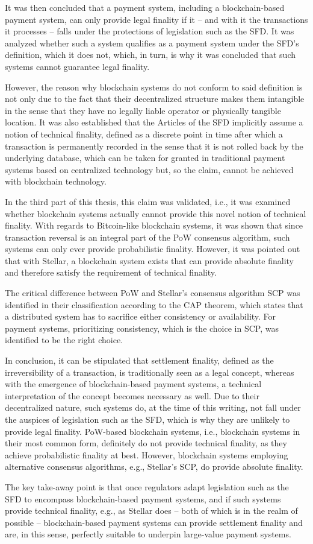 It was then concluded that a payment system, including a blockchain-based payment system, can only provide legal finality if it -- and with it the transactions it processes -- falls under the protections of legislation such as the SFD.
It was analyzed whether such a system qualifies as a payment system under the SFD's definition, which it does not, which, in turn, is why it was concluded that such systems cannot guarantee legal finality.

However, the reason why blockchain systems do not conform to said definition is not only due to the fact that their decentralized structure makes them intangible in the sense that they have no legally liable operator or physically tangible location.
It was also established that the Articles of the SFD implicitly assume a notion of technical finality, defined as a discrete point in time after which a transaction is permanently recorded in the sense that it is not rolled back by the underlying database, which can be taken for granted in traditional payment systems based on centralized technology but, so the claim, cannot be achieved with blockchain technology.

In the third part of this thesis, this claim was validated, i.e., it was examined whether blockchain systems actually cannot provide this novel notion of technical finality.
With regards to Bitcoin-like blockchain systems, it was shown that since transaction reversal is an integral part of the PoW consensus algorithm, such systems can only ever provide probabilistic finality.
However, it was pointed out that with Stellar, a blockchain system exists that can provide absolute finality and therefore satisfy the requirement of technical finality.

The critical difference between PoW and Stellar's consensus algorithm SCP was identified in their classification according to the CAP theorem, which states that a distributed system has to sacrifice either consistency or availability.
For payment systems, prioritizing consistency, which is the choice in SCP, was identified to be the right choice.

In conclusion, it can be stipulated that settlement finality, defined as the irreversibility of a transaction, is traditionally seen as a legal concept, whereas with the emergence of blockchain-based payment systems, a technical interpretation of the concept becomes necessary as well.
Due to their decentralized nature, such systems do, at the time of this writing, not fall under the auspices of legislation such as the SFD, which is why they are unlikely to provide legal finality.
PoW-based blockchain systems, i.e., blockchain systems in their most common form, definitely do not provide technical finality, as they achieve probabilistic finality at best.
However, blockchain systems employing alternative consensus algorithms, e.g., Stellar's SCP, do provide absolute finality.

The key take-away point is that once regulators adapt legislation such as the SFD to encompass blockchain-based payment systems, and if such systems provide technical finality, e.g., as Stellar does -- both of which is in the realm of possible -- blockchain-based payment systems can provide settlement finality and are, in this sense, perfectly suitable to underpin large-value payment systems.
